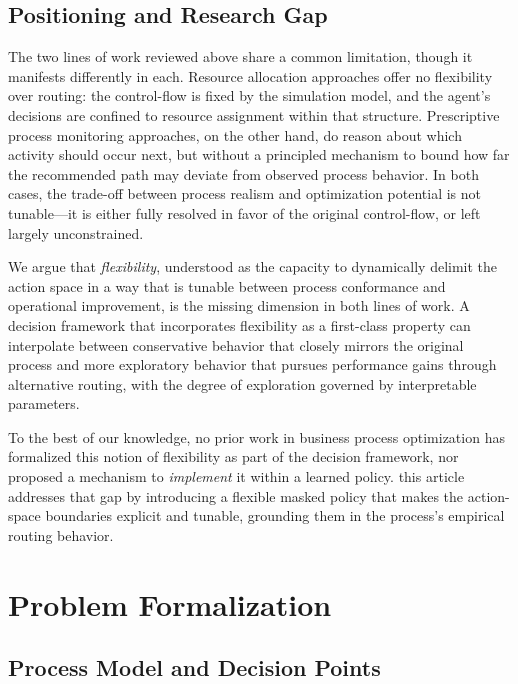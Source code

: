 \documentclass[runningheads]{llncs}
\begin{document}

\subsection{Positioning and Research Gap}
\label{subsec:related_work_positioning}

The two lines of work reviewed above share a common limitation, though it manifests differently in each. Resource allocation approaches offer no flexibility over routing: the control-flow is fixed by the simulation model, and the agent's decisions are confined to resource assignment within that structure. Prescriptive process monitoring approaches, on the other hand, do reason about which activity should occur next, but without a principled mechanism to bound how far the recommended path may deviate from observed process behavior. In both cases, the trade-off between process realism and optimization potential is not tunable---it is either fully resolved in favor of the original control-flow, or left largely unconstrained.

We argue that \emph{flexibility}, understood as the capacity to dynamically delimit the action space in a way that is tunable between process conformance and operational improvement, is the missing dimension in both lines of work. A decision framework that incorporates flexibility as a first-class property can interpolate between conservative behavior that closely mirrors the original process and more exploratory behavior that pursues performance gains through alternative routing, with the degree of exploration governed by interpretable parameters.

To the best of our knowledge, no prior work in business process optimization has formalized this notion of flexibility as part of the decision framework, nor proposed a mechanism to \emph{implement} it within a learned policy. this article addresses that gap by introducing a flexible masked policy that makes the action-space boundaries explicit and tunable, grounding them in the process's empirical routing behavior.

\section{Problem Formalization}
\label{sec:formalization}

\subsection{Process Model and Decision Points}
\label{subsec:process_model_decision_points}
\end{document}
